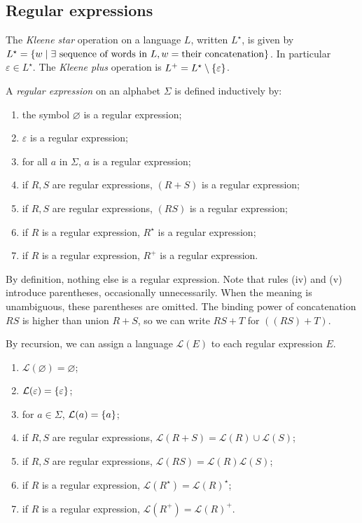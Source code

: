 \subsection{Regular expressions}
\begin{definition}
	The \emph{Kleene star} operation on a language \( L \), written \( L^\star \), is given by \( L^\star = \qty{w \mid \exists \text{ sequence of words in } L, w = \text{their concatenation}} \).
	In particular \( \varepsilon \in L^\star \).
	The \emph{Kleene plus} operation is \( L^+ = L^\star \setminus \qty{\varepsilon} \).
\end{definition}
\begin{definition}
	A \emph{regular expression} on an alphabet \( \Sigma \) is defined inductively by:
	\begin{enumerate}
		\item the symbol \( \varnothing \) is a regular expression;
		\item \( \varepsilon \) is a regular expression;
		\item for all \( a \) in \( \Sigma \), \( a \) is a regular expression;
		\item if \( R, S \) are regular expressions, \( (R + S) \) is a regular expression;
		\item if \( R, S \) are regular expressions, \( (R S) \) is a regular expression;
		\item if \( R \) is a regular expression, \( R^\star \) is a regular expression;
		\item if \( R \) is a regular expression, \( R^+ \) is a regular expression.
	\end{enumerate}
	By definition, nothing else is a regular expression.
	Note that rules (iv) and (v) introduce parentheses, occasionally unnecessarily.
	When the meaning is unambiguous, these parentheses are omitted.
	The binding power of concatenation \( RS \) is higher than union \( R + S \), so we can write \( RS + T \) for \( ((RS) + T) \).

	By recursion, we can assign a language \( \mathcal L(E) \) to each regular expression \( E \).
	\begin{enumerate}
		\item \( \mathcal L(\varnothing) = \varnothing \);
		\item \( \mathcal L(\varepsilon) = \qty{\varepsilon} \);
		\item for \( a \in \Sigma \), \( \mathcal L(a) = \qty{a} \);
		\item if \( R, S \) are regular expressions, \( \mathcal L(R + S) = \mathcal L(R) \cup \mathcal L(S) \);
		\item if \( R, S \) are regular expressions, \( \mathcal L(R S) = \mathcal L(R) \mathcal L(S) \);
		\item if \( R \) is a regular expression, \( \mathcal L(R^\star) = \mathcal L(R)^\star \);
		\item if \( R \) is a regular expression, \( \mathcal L(R^+) = \mathcal L(R)^+ \).
	\end{enumerate}
\end{definition}
